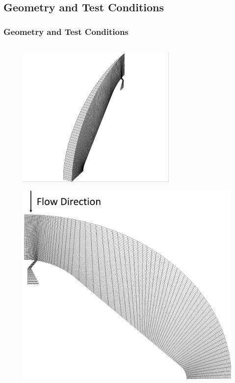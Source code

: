 \documentclass{beamer}
\begin{document}
\subsection{Geometry and Test Conditions}
\begin{frame}
  \frametitle{Geometry and Test Conditions}
  \begin{columns}
    \begin{column}{0.4\textwidth}
      \vspace{-0.5cm}
    \begin{figure}
      \centering
      \includegraphics[width=0.7\textwidth]{figures/iso-coarse.png}
    \end{figure}
    \vspace{-0.75cm}
    \begin{figure}
      \centering
        \includegraphics[width=\textwidth]{figures/side-coarse-flowdir.png}

\end{figure}
\end{column}
\end{columns}
\end{frame}
\end{document}
